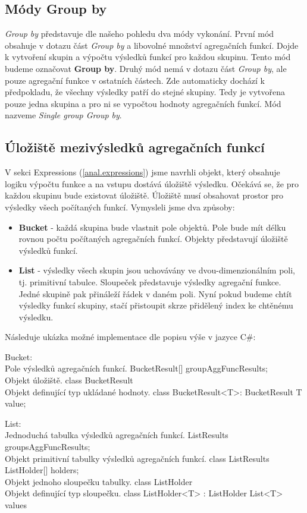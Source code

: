\subsection{Módy Group by}

\textit{Group by} představuje dle našeho pohledu dva módy vykonání.
První mód obsahuje v dotazu část \textit{Group by} a libovolné množství agregačních funkcí.
Dojde k vytvoření skupin a výpočtu výsledků funkcí pro každou skupinu.
Tento mód budeme označovat \textbf{Group by}.
Druhý mód nemá v dotazu část \textit{Group by}, ale pouze agregační funkce v ostatních částech.
Zde automaticky dochází k předpokladu, že všechny výsledky patří do stejné skupiny.
Tedy je vytvořena pouze jedna skupina a pro ni se vypočtou hodnoty agregačních funkcí.
Mód nazveme \textit{Single group Group by}.


\subsection{Úložiště mezivýsledků agregačních funkcí} \label{anal.groupby.uloziste}

V sekci Expressions (\ref{anal.expressions}) jsme navrhli objekt, který obsahuje logiku výpočtu funkce a na vstupu dostává úložiště výsledku.
Očekává se, že pro každou skupinu bude existovat úložiště.
Úložiště musí obsahovat prostor pro výsledky všech počítaných funkcí.
Vymysleli jsme dva způsoby:

\begin{itemize}

\item \textbf{Bucket} - každá skupina bude vlastnit pole objektů. 
Pole bude mít délku rovnou počtu počítaných agregačních funkcí.
Objekty představují úložiště výsledků funkcí.

\item \textbf{List} - výsledky všech skupin jsou uchovávány ve dvou-dimenzionálním poli, tj. primitivní tabulce.
Sloupeček představuje výsledky agregační funkce.
Jedné skupině pak přináleží řádek v daném poli.
Nyní pokud budeme chtít výsledky funkcí skupiny, stačí přistoupit skrze přidělený index ke chtěnému výsledku.
\end{itemize}

Následuje ukázka možné implementace dle popisu výše v jazyce C\#:
\begin{code}
Bucket:
\\ Pole výsledků agregačních funkcí.
BucketResult[] groupAggFuncResults; 
\\ Objekt úložiště. 
class BucketResult {} 
\\ Objekt definující typ ukládané hodnoty.
class BucketResult<T>: BucketResult { T value; }

List:
\\ Jednoduchá tabulka výsledků agregačních funkcí.
ListResults groupsAggFuncResults;
\\ Objekt primitivní tabulky výsledků agregačních funkcí.
class ListResults { ListHolder[] holders; }
\\ Objekt jednoho sloupečku tabulky.
class ListHolder {}
\\ Objekt definující typ sloupečku.
class ListHolder<T> : ListHolder { List<T> values }
\end{code}

